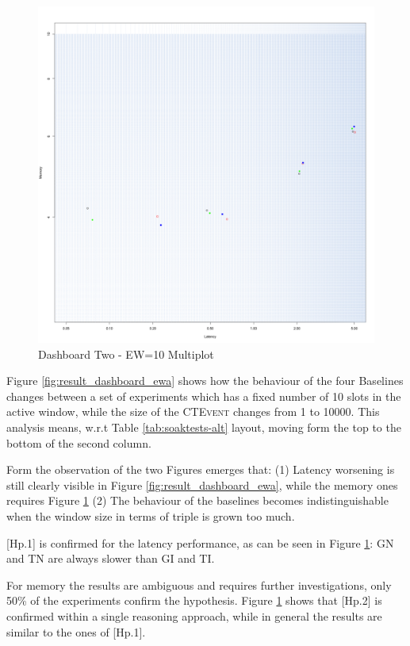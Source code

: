 \begin{figure}[htb]
	\centering
	\includegraphics[width=0.90\linewidth]{images/dashboard-2}	
	\caption{Dashboard Two - EW=10 Multiplot} 
	\label{fig:result_dashboard_ewb}
\end{figure}


Figure \ref{fig:result_dashboard_ewa} shows how the behaviour of the four Baselines changes between a set of experiments which has a fixed number of 10 slots in the active window, while the size of the \textsc{CTEvent} changes from 1 to 10000. This analysis means, w.r.t Table \ref{tab:soaktests-alt} layout, moving form the top to the bottom of the second column.

Form the observation of the two Figures emerges that: (1) Latency worsening is still clearly visible in Figure \ref{fig:result_dashboard_ewa}, while the memory ones requires Figure \ref{fig:result_dashboard_ewb} (2) The behaviour of the baselines becomes indistinguishable when the window size in terms of triple is grown too much. 

[Hp.1] is confirmed for the latency performance, as can be seen in Figure \ref{fig:result_dashboard_ewb}: GN and TN are always slower than GI and TI. 

For memory the results are ambiguous and requires further investigations, only 50\% of the experiments confirm the hypothesis. Figure \ref{fig:result_dashboard_ewb} shows that [Hp.2] is confirmed within a single reasoning approach, while in general the results are similar to the ones of [Hp.1].

